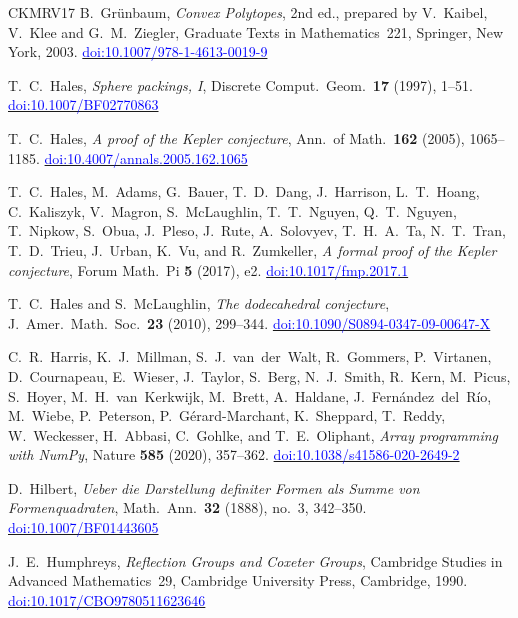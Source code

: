 \documentclass[11pt,reqno]{amsart}
\newcommand{\bluelink}[2]{\href{#1}{\textcolor{blue}{#2}}}
\renewcommand{\_}{\origunderscore\allowbreak}
\numberwithin{equation}{section}
\theoremstyle{plain}
\theoremstyle{definition}
\theoremstyle{remark}
\begin{document}
\begin{thebibliography}{CKMRV17}
B.~Gr\"unbaum,
\textit{Convex Polytopes}, 2nd ed., prepared by V.~Kaibel, V.~Klee and
G.~M.~Ziegler,
Graduate Texts in Mathematics~221, Springer, New York, 2003.
\bluelink{https://doi.org/10.1007/978-1-4613-0019-9}{doi:10.1007/978-1-4613-0019-9}

T.~C.~Hales,
\textit{Sphere packings, {I}},
Discrete Comput.\ Geom.\ \textbf{17} (1997), 1--51.
\bluelink{https://doi.org/10.1007/BF02770863}{doi:10.1007/BF02770863}

T.~C.~Hales,
\textit{A proof of the {K}epler conjecture},
Ann.\ of Math.\ \textbf{162} (2005), 1065--1185.
\bluelink{https://doi.org/10.4007/annals.2005.162.1065}{doi:10.4007/annals.2005.162.1065}

T.~C.~Hales, M.~Adams, G.~Bauer, T.~D.~Dang, J.~Harrison, L.~T.~Hoang,
C.~Kaliszyk, V.~Magron, S.~McLaughlin, T.~T.~Nguyen, Q.~T.~Nguyen,
T.~Nipkow, S.~Obua, J.~Pleso, J.~Rute, A.~Solovyev, T.~H.~A.~Ta,
N.~T.~Tran, T.~D.~Trieu, J.~Urban, K.~Vu, and R.~Zumkeller,
\textit{A formal proof of the {K}epler conjecture},
Forum Math.\ Pi \textbf{5} (2017), e2.
\bluelink{https://doi.org/10.1017/fmp.2017.1}{doi:10.1017/fmp.2017.1}

T.~C.~Hales and S.~McLaughlin,
\textit{The dodecahedral conjecture},
J.\ Amer.\ Math.\ Soc.\ \textbf{23} (2010), 299--344.
\bluelink{https://doi.org/10.1090/S0894-0347-09-00647-X}{doi:10.1090/S0894-0347-09-00647-X}

C.~R.~Harris, K.~J.~Millman, S.~J.~van~der~Walt, R.~Gommers,
P.~Virtanen, D.~Cournapeau, E.~Wieser, J.~Taylor, S.~Berg,
N.~J.~Smith, R.~Kern, M.~Picus, S.~Hoyer, M.~H.~van~Kerkwijk,
M.~Brett, A.~Haldane, J.~Fern\'andez~del~R\'io, M.~Wiebe,
P.~Peterson, P.~G\'erard-Marchant, K.~Sheppard, T.~Reddy,
W.~Weckesser, H.~Abbasi, C.~Gohlke, and T.~E.~Oliphant,
\textit{Array programming with {N}um{P}y},
Nature \textbf{585} (2020), 357--362.
\bluelink{https://doi.org/10.1038/s41586-020-2649-2}{doi:10.1038/s41586-020-2649-2}

D.~Hilbert,
\textit{Ueber die Darstellung definiter Formen als Summe von Formenquadraten},
Math.\ Ann.\ \textbf{32} (1888), no.~3, 342--350.
\bluelink{https://doi.org/10.1007/BF01443605}{doi:10.1007/BF01443605}

J.~E.~Humphreys,
\textit{Reflection Groups and Coxeter Groups},
Cambridge Studies in Advanced Mathematics~29,
Cambridge University Press, Cambridge, 1990.
\bluelink{https://doi.org/10.1017/CBO9780511623646}{doi:10.1017/CBO9780511623646}


\end{thebibliography}
\end{document}

